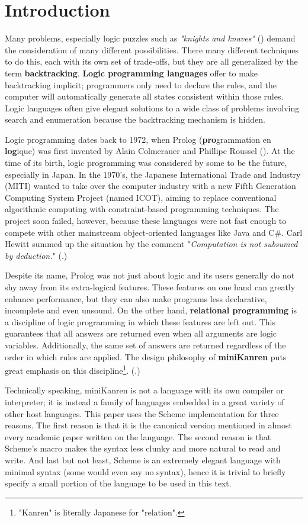 \section{Introduction}
Many problems, especially logic puzzles such as \textit{"knights and knaves"} (\cite{knight}) demand the consideration of many different possibilities. There many different techniques to do this, each with its own set of trade-offs, but they are all generalized by the term \textbf{backtracking}. \textbf{Logic programming languages} offer to make backtracking implicit; programmers only need to declare the rules, and the computer will automatically generate all states consistent within those rules. Logic languages often give elegant solutions to a wide class of problems involving search and enumeration because the backtracking mechanism is hidden.

Logic programming dates back to 1972, when Prolog (\textbf{pro}grammation en \textbf{log}ique) was first invented by Alain Colmerauer and Phillipe Roussel (\cite{early-prolog}). At the time of its birth, logic programming was considered by some to be the future, especially in Japan. In the 1970's, the Japanese International Trade and Industry (MITI) wanted to take over the computer industry with a new Fifth Generation Computing System Project (named ICOT), aiming to replace conventional algorithmic computing with constraint-based programming techniques. The project soon failed, however, because these languages were not fast enough to compete with other mainstream object-oriented languages like Java and C\#. Carl Hewitt summed up the situation by the comment "\textit{Computation is not subsumed by deduction.}" (\cite{logic-fail}.)

Despite its name, Prolog was not just about logic and its users generally do not shy away from its extra-logical features. These features on one hand can greatly enhance performance, but they can also make programs less declarative, incomplete and even unsound. On the other hand, \textbf{relational programming} is a discipline of logic programming in which these features are left out. This guarantees that all answers are returned even when all arguments are logic variables. Additionally, the same set of answers are returned regardless of the order in which rules are applied. The design philosophy of \textbf{miniKanren} puts great emphasis on this discipline\footnote{"Kanren" is literally Japanese for "relation".}. (\cite{byrdphd}.)

Technically speaking, miniKanren is not a language with its own compiler or interpreter; it is instead a family of languages embedded in a great variety of other host languages. This paper uses the Scheme implementation for three reasons. The first reason is that it is the canonical version mentioned in almost every academic paper written on the language. The second reason is that Scheme's macro makes the syntax less clunky and more natural to read and write. And last but not least, Scheme is an extremely elegant language with minimal syntax (some would even say no syntax), hence it is trivial to briefly specify a small portion of the language to be used in this text.

